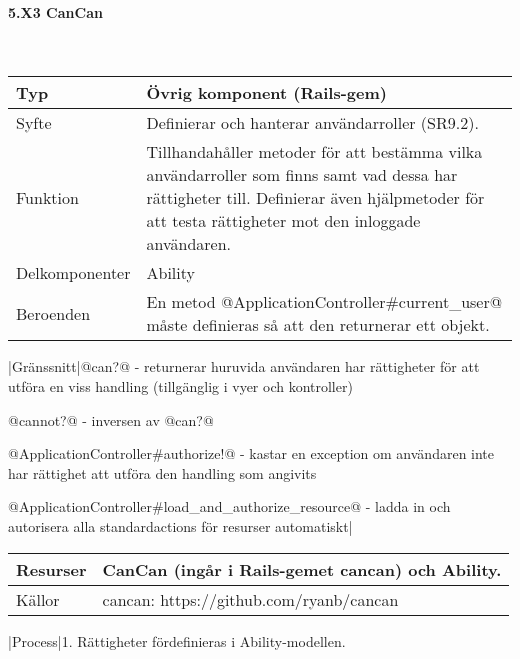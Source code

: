 \documentclass[a4paper, twoside, 11pt, titlepage]{article}
\begin{document}
			\paragraph{5.X3 CanCan}\

			\begin {table} [ht] \begin{tabular} {  p{3.5cm} p{9.6cm} }
				\hline
				Typ & Övrig komponent (Rails-gem)  \\
				\hline
				Syfte & Definierar och hanterar användarroller (SR9.2).  \\
				\hline
				Funktion & Tillhandahåller metoder för att bestämma vilka användarroller som finns samt vad dessa har rättigheter till. Definierar även hjälpmetoder för att testa rättigheter mot den inloggade användaren.  \\
				\hline
				Delkomponenter & Ability  \\
				\hline
				Beroenden & En metod @ApplicationController\#current\_user@ måste definieras så att den returnerar ett objekt.  \\
				\hline
			\end{tabular} \end{table} \FloatBarrier
			\vspace{6mm}

			|Gränssnitt|@can?@ - returnerar huruvida användaren har rättigheter för att utföra en viss handling (tillgänglig i vyer och kontroller)

			@cannot?@ - inversen av @can?@

			@ApplicationController\#authorize!@ - kastar en exception om användaren inte har rättighet att utföra den handling som angivits

			@ApplicationController\#load\_and\_authorize\_resource@ - ladda in och autorisera alla standardactions för resurser automatiskt|

			\begin {table} [ht] \begin{tabular} {  p{3.5cm} p{9.6cm} }
				\hline
				Resurser & CanCan (ingår i Rails-gemet cancan) och Ability.  \\
				\hline
				Källor & cancan: https://github.com/ryanb/cancan  \\
				\hline
			\end{tabular} \end{table} \FloatBarrier
			\vspace{6mm}

			|Process|1. Rättigheter fördefinieras i Ability-modellen.
\end{document}
